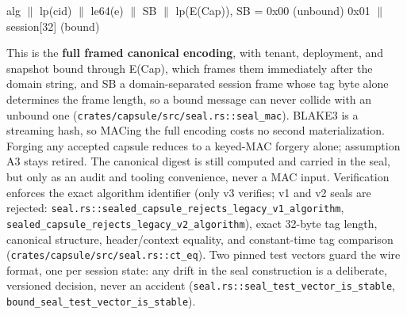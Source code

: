 \documentclass[
  11pt,
]{article}
\begin{document}
alg $\parallel$ lp(cid) $\parallel$ le64(e) $\parallel$ SB $\parallel$ lp(E(Cap)), SB = 0x00 (unbound) \textbar{} 0x01 $\parallel$ session{[}32{]} (bound)

This is the \textbf{full framed canonical encoding}, with tenant, deployment, and snapshot bound through E(Cap), which frames them immediately after the domain string, and SB a domain-separated session frame whose tag byte alone determines the frame length, so a bound message can never collide with an unbound one (\texttt{crates/capsule/src/seal.rs::seal\_mac}). BLAKE3 \cite{blake3-2020} is a streaming hash, so MACing the full encoding costs no second materialization. Forging any accepted capsule reduces to a keyed-MAC forgery alone; assumption A3 stays retired. The canonical digest is still computed and carried in the seal, but only as an audit and tooling convenience, never a MAC input. Verification enforces the exact algorithm identifier (only v3 verifies; v1 and v2 seals are rejected: \texttt{seal.rs::sealed\_capsule\_rejects\_legacy\_v1\_algorithm}, \texttt{sealed\_capsule\_rejects\_legacy\_v2\_algorithm}), exact 32-byte tag length, canonical structure, header/context equality, and constant-time tag comparison (\texttt{crates/capsule/src/seal.rs::ct\_eq}). Two pinned test vectors guard the wire format, one per session state: any drift in the seal construction is a deliberate, versioned decision, never an accident (\texttt{seal.rs::seal\_test\_vector\_is\_stable}, \texttt{bound\_seal\_test\_vector\_is\_stable}).
\end{document}
